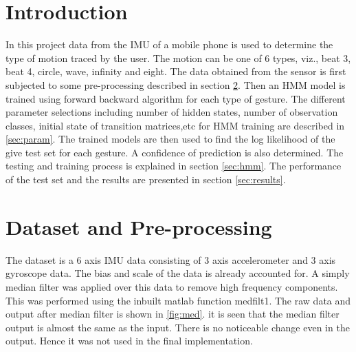 \documentclass[fleqn,10pt]{SelfArx} %
\begin{document}
\flushbottom %

\maketitle %

\tableofcontents %

\thispagestyle{empty} %

\section{Introduction}
In this project data from the IMU of a mobile phone is used to determine the type of motion traced by the user. The motion can be one of 6 types, viz., beat 3, beat 4, circle, wave, infinity and eight. The data obtained from the sensor is first subjected to some pre-processing described in section \ref{sec:pprocessing}. Then an HMM model is trained using forward backward algorithm for each type of gesture. The different parameter selections including number of hidden states, number of observation classes, initial state of transition matrices,etc for HMM training are described in \ref{sec:param}. The trained models are then used to find the log likelihood of the give test set for each gesture. A confidence of prediction is also determined. The testing and training process is explained in section \ref{sec:hmm}. The performance of the test set and the results are presented in section \ref{sec:results}.

\section{Dataset  and Pre-processing}
\label{sec:pprocessing}
The dataset is a 6 axis IMU data consisting of 3 axis accelerometer and 3 axis gyroscope data. The bias and scale of the data is already accounted for. A simply median filter was applied over this data to remove high frequency components. This was performed using the inbuilt matlab function medfilt1. The raw data and output after median filter is shown in \ref{fig:med}. it is seen that the median filter output is almost the same as the input. There is no noticeable change even in the output. Hence it was not used in the final implementation.
\end{document}
